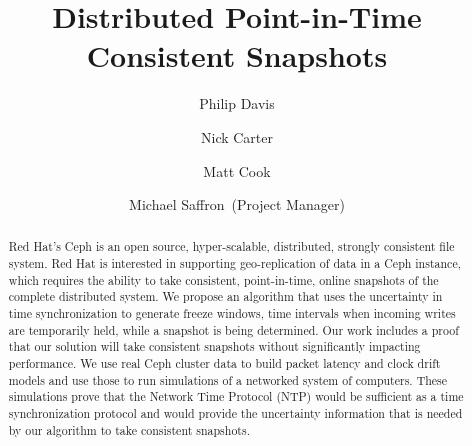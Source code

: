 \documentclass[report]{hmcclinic}
\title{Distributed Point-in-Time Consistent Snapshots}
\author{Philip Davis \and Nick Carter \and Matt Cook \and Michael Saffron~(Project Manager)}
\begin{document}

\frontmatter




\maketitle



\begin{abstract}
  Red Hat's Ceph is an open source, hyper-scalable, distributed, strongly consistent file system. Red Hat is interested in supporting geo-replication of data in a Ceph instance, which requires the ability to take consistent, point-in-time, online snapshots of the complete distributed system. We propose an algorithm that uses the uncertainty in time synchronization to generate freeze windows, time intervals when incoming writes are temporarily held, while a snapshot is being determined. Our work includes a proof that our solution will take consistent snapshots without significantly impacting performance. We use real Ceph cluster data to build packet latency and clock drift models and use those to run simulations of a networked system of computers. These simulations prove that the Network Time Protocol (NTP) would be sufficient as a time synchronization protocol and would provide the uncertainty information that is needed by our algorithm to take consistent snapshots.
\end{abstract}


\end{document}
